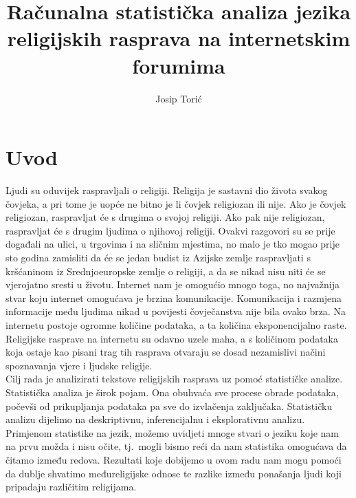 \documentclass[times,utf8,zavrsni]{fer}
\begin{document}


\title{Računalna statistička analiza jezika religijskih rasprava na internetskim forumima}

\author{Josip Torić}

\maketitle


\tableofcontents

\chapter{Uvod}
Ljudi su oduvijek raspravljali o religiji. Religija je sastavni dio života svakog čovjeka, a pri tome je uopće ne bitno je li čovjek religiozan ili nije. Ako je čovjek religiozan, raspravljat će s drugima o svojoj religiji. Ako pak nije religiozan, raspravljat će s drugim ljudima o njihovoj religiji. Ovakvi razgovori su se prije događali na ulici, u trgovima i na sličnim mjestima, no malo je tko mogao prije sto godina zamisliti da će se jedan budist iz Azijske zemlje raspravljati s kršćaninom iz Srednjoeuropske zemlje o religiji, a da se nikad nisu niti će se vjerojatno sresti u životu. Internet nam je omogućio mnogo toga, no najvažnija stvar koju internet omogućava je brzina komunikacije. Komunikacija i razmjena informacije među ljudima nikad u povijesti čovječanstva nije bila ovako brza. Na internetu postoje ogromne količine podataka, a ta količina eksponencijalno raste. Religijske rasprave na internetu su odavno uzele maha, a s količinom podataka koja ostaje kao pisani trag tih rasprava otvaraju se dosad nezamislivi načini spoznavanja vjere i ljudske religije. \\

Cilj rada je analizirati tekstove religijskih rasprava uz pomoć statističke analize. Statistička analiza je širok pojam. Ona obuhvaća sve procese obrade podataka, počevši od prikupljanja podataka pa sve do izvlačenja zaključaka. Statističku analizu dijelimo na deskriptivnu, inferencijalnu i eksplorativnu analizu. Primjenom statistike na jezik, možemo uvidjeti mnoge stvari o jeziku koje nam na prvu možda i nisu očite, tj.~mogli bismo reći da nam statistika omogućava da čitamo između redova. Rezultati koje dobijemo u ovom radu nam mogu pomoći da dublje shvatimo međureligijske odnose te razlike između ponašanja ljudi koji pripadaju različitim religijama.\\
\end{document}
